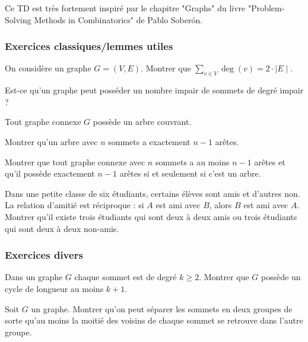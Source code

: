 ﻿Ce TD est très fortement inspiré par le chapitre "Graphs" du livre "Problem-Solving Methods in Combinatorics" de Pablo Soberón.


\subsubsection{Exercices classiques/lemmes utiles}


\begin{exo}
On considère un graphe $G=(V,E)$. Montrer que $\sum_{v \in V} \deg(v) = 2 \cdot \mid E \mid$.
\end{exo}


\begin{exo}
Est-ce qu’un graphe peut posséder un nombre impair de sommets de degré impair ?
\end{exo}


\begin{exo}
Tout graphe connexe $G$ possède un arbre couvrant.
\end{exo}


\begin{exo}
Montrer qu’un arbre avec $n$ sommets a exactement $n-1$ arêtes.
\end{exo}


\begin{exo}
Montrer que tout graphe connexe avec $n$ sommets a au moins $n-1$ arêtes et qu'il possède exactement $n-1$ arêtes si et seulement si c'est un arbre.
\end{exo}


\begin{exo}
Dans une petite classe de six étudiants, certains élèves sont amis et d'autres non. La relation d'amitié est réciproque : si $A$ est ami avec $B$, alors $B$ est ami avec $A$. Montrer qu'il existe trois étudiants qui sont deux à deux amis ou trois étudiants qui sont deux à deux non-amis.
\end{exo}


\subsubsection{Exercices divers}


\begin{exo}
Dans un graphe $G$ chaque sommet est de degré $k\ge 2$. Montrer que $G$ possède un cycle de longueur au moins $k+1$.
\end{exo}


\begin{exo}
Soit $G$ un graphe. Montrer qu’on peut séparer les sommets en deux groupes de sorte qu’au moins la moitié des voisins de chaque sommet se retrouve dans l’autre groupe.
\end{exo}


